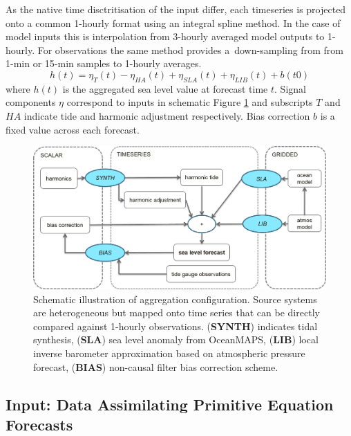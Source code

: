 As the native time disctritisation of the input differ, each timeseries is projected onto a common 1-hourly format using an integral spline method.  
In the case of model inputs this is interpolation from 3-hourly averaged model outputs to 1-hourly.  
For observations the same method provides a~down-sampling from from 1-min or 15-min samples to 1-hourly averages.  
\begin{equation}
h(t) = \eta_{T}(t) - \eta_{HA}(t) + \eta_{SLA}(t) + \eta_{LIB}(t) + b(t0)
\label{eq:aggSL}
\end{equation}
where $h(t)$ is the aggregated sea level value at forecast time $t$.  
Signal components $\eta$ correspond to inputs in schematic Figure \ref{fig:aggSL} and subscripts $T$ and $HA$ indicate tide and harmonic adjustment respectively.    
Bias correction $b$ is a fixed value across each forecast.
\vspace{6pt}
\begin{figure}[H]
\centering
\includegraphics[width=1.0\textwidth]{figures/diagrams/aggSL_schematic_abstract.png}
\caption{Schematic illustration of aggregation configuration.  Source systems are heterogeneous but mapped onto time series that can be directly compared against 1-hourly observations.  (\textbf{SYNTH}) indicates tidal synthesis, (\textbf{SLA}) sea level anomaly from OceanMAPS, (\textbf{LIB}) local inverse barometer approximation based on atmospheric pressure forecast, (\textbf{BIAS}) non-causal filter bias correction scheme. }
\label{fig:aggSL}
\end{figure}   



\subsection{Input: Data Assimilating Primitive Equation Forecasts }
\label{sec:dynamicmodels}

